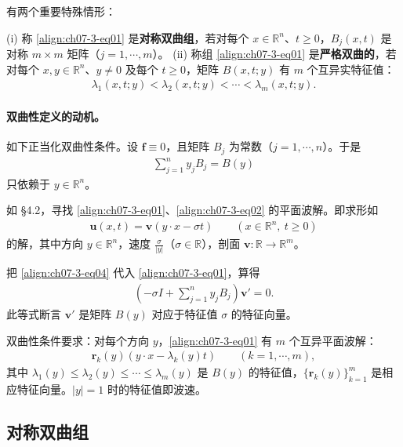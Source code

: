 \documentclass[../../main.tex]{subfiles}
\begin{document}
有两个重要特殊情形：

\begin{definition}\label{definition:ch07-3-对称严格双曲}
(i) 称 \eqref{align:ch07-3-eq01} 是\textbf{对称双曲组}，若对每个 $x\in\mathbb{R}^n$、$t\geqslant 0$，$B_j(x,t)$ 是对称 $m\times m$ 矩阵（$j=1,\cdots,m$）。
(ii) 称组 \eqref{align:ch07-3-eq01} 是\textbf{严格双曲的}，若对每个 $x,y\in\mathbb{R}^n$、$y\neq 0$ 及每个 $t\geqslant 0$，矩阵 $B(x,t;y)$ 有 $m$ 个互异实特征值：
\begin{align*}
\lambda_1(x,t;y)<\lambda_2(x,t;y)<\cdots<\lambda_m(x,t;y).
\end{align*}
\end{definition}

\paragraph{双曲性定义的动机。}如下正当化双曲性条件。设 $\mathbf{f}\equiv 0$，且矩阵 $B_j$ 为常数（$j=1,\cdots,n$）。于是
\begin{align}
\sum_{j=1}^n y_jB_j=B(y)\label{align:ch07-3-eq03}
\end{align}
只依赖于 $y\in\mathbb{R}^n$。

如 \S4.2，寻找 \eqref{align:ch07-3-eq01}、\eqref{align:ch07-3-eq02} 的平面波解。即求形如
\begin{align}
\mathbf{u}(x,t)=\mathbf{v}(y\cdot x-\sigma t)\qquad (x\in\mathbb{R}^n,\ t\geqslant 0)\label{align:ch07-3-eq04}
\end{align}
的解，其中方向 $y\in\mathbb{R}^n$，速度 $\frac\sigma{|y|}$（$\sigma\in\mathbb{R}$），剖面 $\mathbf{v}:\mathbb{R}\to\mathbb{R}^m$。

把 \eqref{align:ch07-3-eq04} 代入 \eqref{align:ch07-3-eq01}，算得
\begin{align*}
\left(-\sigma I+\sum_{j=1}^n y_jB_j\right)\mathbf{v}'=0.
\end{align*}
此等式断言 $\mathbf{v}'$ 是矩阵 $B(y)$ 对应于特征值 $\sigma$ 的特征向量。

双曲性条件要求：对每个方向 $y$，\eqref{align:ch07-3-eq01} 有 $m$ 个互异平面波解：
\begin{align*}
\mathbf{r}_k(y)\left(y\cdot x-\lambda_k(y)t\right)\qquad (k=1,\cdots,m),
\end{align*}
其中 $\lambda_1(y)\leqslant\lambda_2(y)\leqslant\cdots\leqslant\lambda_m(y)$ 是 $B(y)$ 的特征值，$\{\mathbf{r}_k(y)\}_{k=1}^m$ 是相应特征向量。$|y|=1$ 时的特征值即波速。

\subsection{对称双曲组}\label{subsection:ch07-3-2-对称双曲组}
\end{document}
